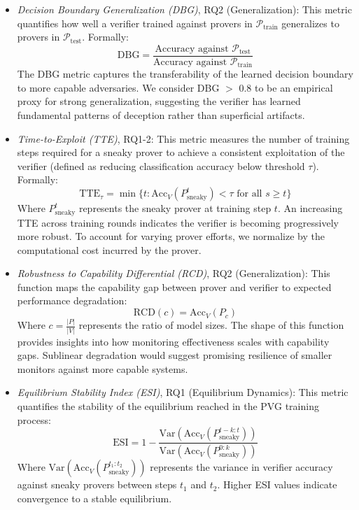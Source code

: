\begin{itemize}
    \item \emph{Decision Boundary Generalization (DBG)}, RQ2 (Generalization): This metric quantifies how well a verifier trained against provers in $\mathcal{P}_{\text{train}}$ generalizes to provers in $\mathcal{P}_{\text{test}}$. Formally:
    $$\text{DBG} = \frac{\text{Accuracy against } \mathcal{P}_{\text{test}}}{\text{Accuracy against } \mathcal{P}_{\text{train}}}$$
    The DBG metric captures the transferability of the learned decision boundary to more capable adversaries. We consider DBG $>$ 0.8 to be an empirical proxy for strong generalization, suggesting the verifier has learned fundamental patterns of deception rather than superficial artifacts.
    \item \emph{Time-to-Exploit (TTE)}, RQ1-2: This metric measures the number of training steps required for a sneaky prover to achieve a consistent exploitation of the verifier (defined as reducing classification accuracy below threshold $\tau$). Formally:
    $$\text{TTE}_{\tau} = \min \{t : \text{Acc}_V(P_{\text{sneaky}}^t) < \tau \text{ for all } s \geq t\}$$
    Where $P_{\text{sneaky}}^t$ represents the sneaky prover at training step $t$. An increasing TTE across training rounds indicates the verifier is becoming progressively more robust. To account for varying prover efforts, we normalize by the computational cost incurred by the prover.
    \item \emph{Robustness to Capability Differential (RCD)}, RQ2 (Generalization): This function maps the capability gap between prover and verifier to expected performance degradation:
    $$\text{RCD}(c) = \text{Acc}_V(P_{c})$$
    Where $c = \frac{|P|}{|V|}$ represents the ratio of model sizes. The shape of this function provides insights into how monitoring effectiveness scales with capability gaps. Sublinear degradation would suggest promising resilience of smaller monitors against more capable systems.
    \item \emph{Equilibrium Stability Index (ESI)}, RQ1 (Equilibrium Dynamics): This metric quantifies the stability of the equilibrium reached in the PVG training process:
    $$\text{ESI} = 1 - \frac{\text{Var}(\text{Acc}_V(P_{\text{sneaky}}^{t-k:t}))}{\text{Var}(\text{Acc}_V(P_{\text{sneaky}}^{0:k}))}$$
    Where $\text{Var}(\text{Acc}_V(P_{\text{sneaky}}^{t_1:t_2}))$ represents the variance in verifier accuracy against sneaky provers between steps $t_1$ and $t_2$. Higher ESI values indicate convergence to a stable equilibrium.

\end{itemize}
